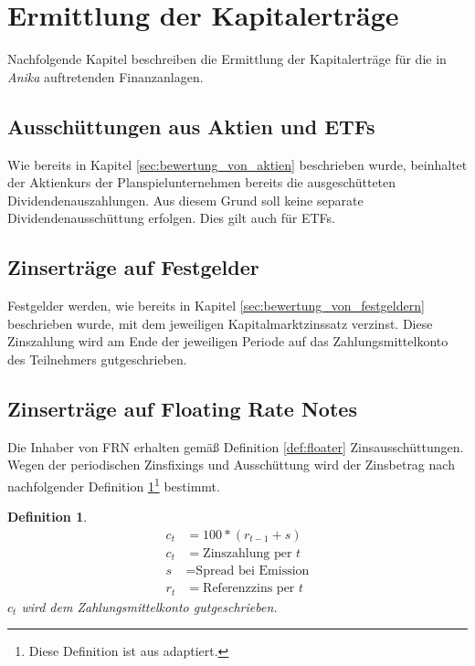 \documentclass[12pt, a4paper]{article}
\theoremstyle{plain}
\newtheorem{definition}{Definition}
\begin{document}
\section{Ermittlung der Kapitalerträge}
\label{sec:ermittlung_von_wertpapierertraegen}

Nachfolgende Kapitel beschreiben die Ermittlung der Kapitalerträge für die in \textit{Anika} auftretenden Finanzanlagen.

\subsection{Ausschüttungen aus Aktien und ETFs}
\label{sec:ausschuettung_aus_aktie}
Wie bereits in Kapitel \ref{sec:bewertung_von_aktien} beschrieben wurde, beinhaltet der Aktienkurs der Planspielunternehmen bereits die ausgeschütteten Dividendenauszahlungen. Aus diesem Grund soll keine separate Dividendenausschüttung erfolgen. Dies gilt auch für \glspl{ETF}.

\subsection{Zinserträge auf Festgelder}
\label{sec:zinsertraege_auf_festgelder}
Festgelder werden, wie bereits in Kapitel \ref{sec:bewertung_von_festgeldern} beschrieben wurde, mit dem jeweiligen Kapitalmarktzinssatz verzinst. Diese Zinszahlung wird am Ende der jeweiligen Periode auf das Zahlungsmittelkonto des Teilnehmers gutgeschrieben.

\subsection{Zinserträge auf Floating Rate Notes}
\label{sec:zinsertraege_auf_floating_rate_notes}

Die Inhaber von \gls{FRN} erhalten gemäß Definition \ref{def:floater} Zinsausschüttungen.
Wegen der periodischen Zinsfixings und Ausschüttung wird der Zinsbetrag nach nachfolgender Definition \ref{def:zins_floater}\footnote{Diese Definition ist aus \textcite[][S.~52]{veronesi_fixed_2010} adaptiert.} bestimmt.

\begin{definition}
	\label{def:zins_floater}
\begin{align*}
	c_t &= 100 * (r_{t-1} + s)\\
	c_t &= \text{Zinszahlung per $t$}\\
	s &= \text{Spread bei Emission}\\
	r_t &= \text{Referenzzins per $t$}
\end{align*}
$c_t$ wird dem Zahlungsmittelkonto gutgeschrieben.
\end{definition}
\end{document}
